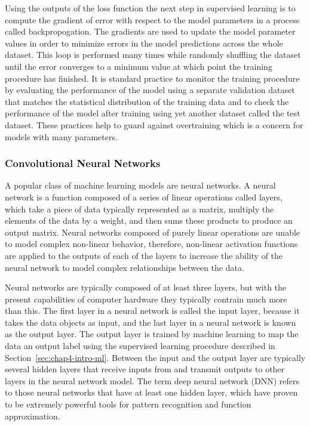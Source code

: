 Using the outputs of the loss function the next step in supervised learning is to compute the gradient of error with respect to the model parameters in a process called backpropogation. The gradients are used to update the model parameter values in order to minimize errors in the model predictions across the whole dataset. This loop is performed many times while randomly shuffling the dataset until the error converges to a minimum value at which point the training procedure has finished. It is standard practice to monitor the training procedure by evaluating the performance of the model using a separate validation dataset that matches the statistical distribution of the training data and to check the performance of the model after training using yet another dataset called the test dataset. These practices help to guard against overtraining which is a concern for models with many parameters.

\subsubsection*{Convolutional Neural Networks}

A popular class of machine learning models are neural networks. A neural network is a function composed of a series of linear operations called layers, which take a piece of data typically represented as a matrix, multiply the elements of the data by a weight, and then sums these products to produce an output matrix. Neural networks composed of purely linear operations are unable to model complex non-linear behavior, therefore, non-linear activation functions are applied to the outputs of each of the layers to increase the ability of the neural network to model complex relationships between the data. 

Neural networks are typically composed of at least three layers, but with the present capabilities of computer hardware they typically contrain much  more than this. The first layer in a neural network is called the input layer, because it takes the data objects as input, and the last layer in a neural network is known as the output layer. The output layer is trained by machine learning to map the data an output label using the supervised learning procedure described in Section~\ref{sec:chap4-intro-ml}. Between the input and the output layer are typically several hidden layers that receive inputs from and transmit outputs to other layers in the neural network model. The term deep neural network (DNN) refers to those neural networks that have at least one hidden layer, which have proven to be extremely powerful tools for pattern recognition and function approximation.

